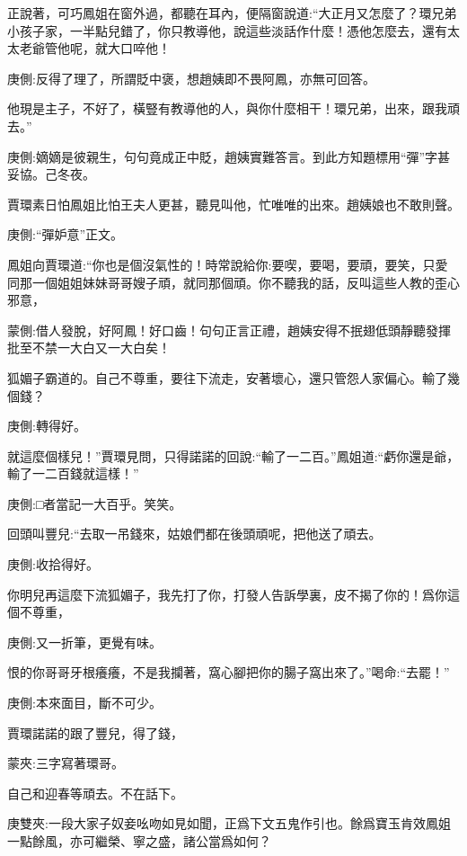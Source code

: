 \begin{parag}
    正說著，可巧鳳姐在窗外過，都聽在耳內，便隔窗說道:“大正月又怎麼了？環兄弟小孩子家，一半點兒錯了，你只教導他，說這些淡話作什麼！憑他怎麼去，還有太太老爺管他呢，就大口啐他！\begin{note}庚側:反得了理了，所謂貶中褒，想趙姨即不畏阿鳳，亦無可回答。\end{note}他現是主子，不好了，橫豎有教導他的人，與你什麼相干！環兄弟，出來，跟我頑去。”\begin{note}庚側:嫡嫡是彼親生，句句竟成正中貶，趙姨實難答言。到此方知題標用“彈”字甚妥協。己冬夜。\end{note}賈環素日怕鳳姐比怕王夫人更甚，聽見叫他，忙唯唯的出來。趙姨娘也不敢則聲。\begin{note}庚側:“彈妒意”正文。\end{note}鳳姐向賈環道:“你也是個沒氣性的！時常說給你:要喫，要喝，要頑，要笑，只愛同那一個姐姐妹妹哥哥嫂子頑，就同那個頑。你不聽我的話，反叫這些人教的歪心邪意，\begin{note}蒙側:借人發脫，好阿鳳！好口齒！句句正言正禮，趙姨安得不抿翅低頭靜聽發揮批至不禁一大白又一大白矣！\end{note}狐媚子霸道的。自己不尊重，要往下流走，安著壞心，還只管怨人家偏心。輸了幾個錢？\begin{note}庚側:轉得好。\end{note}就這麼個樣兒！”賈環見問，只得諾諾的回說:“輸了一二百。”鳳姐道:“虧你還是爺，輸了一二百錢就這樣！”\begin{note}庚側:□者當記一大百乎。笑笑。\end{note}回頭叫豐兒:“去取一吊錢來，姑娘們都在後頭頑呢，把他送了頑去。\begin{note}庚側:收拾得好。\end{note}你明兒再這麼下流狐媚子，我先打了你，打發人告訴學裏，皮不揭了你的！爲你這個不尊重，\begin{note}庚側:又一折筆，更覺有味。\end{note}恨的你哥哥牙根癢癢，不是我攔著，窩心腳把你的腸子窩出來了。”喝命:“去罷！”\begin{note}庚側:本來面目，斷不可少。\end{note}賈環諾諾的跟了豐兒，得了錢，\begin{note}蒙夾:三字寫著環哥。\end{note}自己和迎春等頑去。不在話下。\begin{note}庚雙夾:一段大家子奴妾吆吻如見如聞，正爲下文五鬼作引也。餘爲寶玉肯效鳳姐一點餘風，亦可繼榮、寧之盛，諸公當爲如何？\end{note}
\end{parag}


